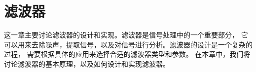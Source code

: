 \section{滤波器}

这一章主要讨论滤波器的设计和实现。滤波器是信号处理中的一个重要部分，
它可以用来去除噪声，提取信号，以及对信号进行分析。滤波器的设计是一个复杂的过程，
需要根据具体的应用来选择合适的滤波器类型和参数。
在本章中，我们将讨论滤波器的基本原理，以及如何设计和实现滤波器。




